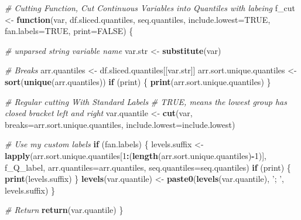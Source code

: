 \documentclass[
]{article}
\newenvironment{Shaded}{\begin{snugshade}}{\end{snugshade}}
\newcommand{\CommentTok}[1]{\textcolor[rgb]{0.56,0.35,0.01}{\textit{#1}}}
\newcommand{\ControlFlowTok}[1]{\textcolor[rgb]{0.13,0.29,0.53}{\textbf{#1}}}
\newcommand{\DataTypeTok}[1]{\textcolor[rgb]{0.13,0.29,0.53}{#1}}
\newcommand{\DecValTok}[1]{\textcolor[rgb]{0.00,0.00,0.81}{#1}}
\newcommand{\KeywordTok}[1]{\textcolor[rgb]{0.13,0.29,0.53}{\textbf{#1}}}
\newcommand{\NormalTok}[1]{#1}
\newcommand{\OperatorTok}[1]{\textcolor[rgb]{0.81,0.36,0.00}{\textbf{#1}}}
\newcommand{\OtherTok}[1]{\textcolor[rgb]{0.56,0.35,0.01}{#1}}
\newcommand{\StringTok}[1]{\textcolor[rgb]{0.31,0.60,0.02}{#1}}
\begin{document}
\begin{Shaded}
\begin{Highlighting}[]
\CommentTok{# Cutting Function, Cut Continuous Variables into Quantiles with labeing}
\NormalTok{f_cut <-}\StringTok{ }\ControlFlowTok{function}\NormalTok{(var, df.sliced.quantiles, seq.quantiles, }
                  \DataTypeTok{include.lowest=}\OtherTok{TRUE}\NormalTok{, }\DataTypeTok{fan.labels=}\OtherTok{TRUE}\NormalTok{, }\DataTypeTok{print=}\OtherTok{FALSE}\NormalTok{) \{}
  
  \CommentTok{# unparsed string variable name}
\NormalTok{  var.str <-}\StringTok{ }\KeywordTok{substitute}\NormalTok{(var)}
  
  \CommentTok{# Breaks}
\NormalTok{  arr.quantiles <-}\StringTok{ }\NormalTok{df.sliced.quantiles[[var.str]]}
\NormalTok{  arr.sort.unique.quantiles <-}\StringTok{ }\KeywordTok{sort}\NormalTok{(}\KeywordTok{unique}\NormalTok{(arr.quantiles))}
  \ControlFlowTok{if}\NormalTok{ (print) \{}
    \KeywordTok{print}\NormalTok{(arr.sort.unique.quantiles)}
\NormalTok{  \}}
  
  \CommentTok{# Regular cutting With Standard Labels}
  \CommentTok{# TRUE, means the lowest group has closed bracket left and right}
\NormalTok{  var.quantile <-}\StringTok{ }\KeywordTok{cut}\NormalTok{(var, }\DataTypeTok{breaks=}\NormalTok{arr.sort.unique.quantiles, }
                      \DataTypeTok{include.lowest=}\NormalTok{include.lowest)}
  
  \CommentTok{# Use my custom labels}
  \ControlFlowTok{if}\NormalTok{ (fan.labels) \{}
\NormalTok{    levels.suffix <-}\StringTok{ }
\StringTok{      }\KeywordTok{lapply}\NormalTok{(arr.sort.unique.quantiles[}\DecValTok{1}\OperatorTok{:}\NormalTok{(}\KeywordTok{length}\NormalTok{(arr.sort.unique.quantiles)}\OperatorTok{-}\DecValTok{1}\NormalTok{)],}
\NormalTok{             f_Q_label,}
             \DataTypeTok{arr.quantiles=}\NormalTok{arr.quantiles,}
             \DataTypeTok{seq.quantiles=}\NormalTok{seq.quantiles)}
    \ControlFlowTok{if}\NormalTok{ (print) \{}
      \KeywordTok{print}\NormalTok{(levels.suffix)}
\NormalTok{    \}}
    \KeywordTok{levels}\NormalTok{(var.quantile) <-}\StringTok{ }\KeywordTok{paste0}\NormalTok{(}\KeywordTok{levels}\NormalTok{(var.quantile), }\StringTok{'; '}\NormalTok{, levels.suffix)}
\NormalTok{  \}}
  
  \CommentTok{# Return}
  \KeywordTok{return}\NormalTok{(var.quantile)}
\NormalTok{\}}
\end{Highlighting}
\end{Shaded}
\end{document}
